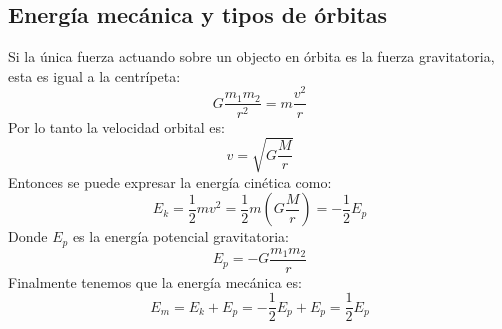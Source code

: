 \documentclass[arial,a4paper,print]{article}
\begin{document}
\subsection{Energía mecánica y tipos de órbitas}
Si la única fuerza actuando sobre un objecto en órbita es la fuerza gravitatoria, esta es igual a la centrípeta: 
\begin{equation*}
	G\frac{m_{1}m_{2}}{r^{2}} = m\frac{v^{2}}{r}
\end{equation*}
Por lo tanto la velocidad orbital es:
\begin{equation*}
	v=\sqrt{G\frac Mr}
\end{equation*}
Entonces se puede expresar la energía cinética como:
\begin{equation*}
	E_{k} = \frac 12 mv^2=\frac12m\left(G\frac Mr\right) = -\frac12 E_{p}
\end{equation*}
Donde $ E_{p}$ es la energía potencial gravitatoria:
\begin{equation*}
	E_{p} = -G\frac{m_{1}m_{2}}{r}
\end{equation*}
Finalmente tenemos que la energía mecánica es:
\begin{equation*}
	E_{m} = E_{k} + E_{p} = -\frac12E_{p} + E_{p} = \frac12 E_{p}
\end{equation*}
\end{document}
